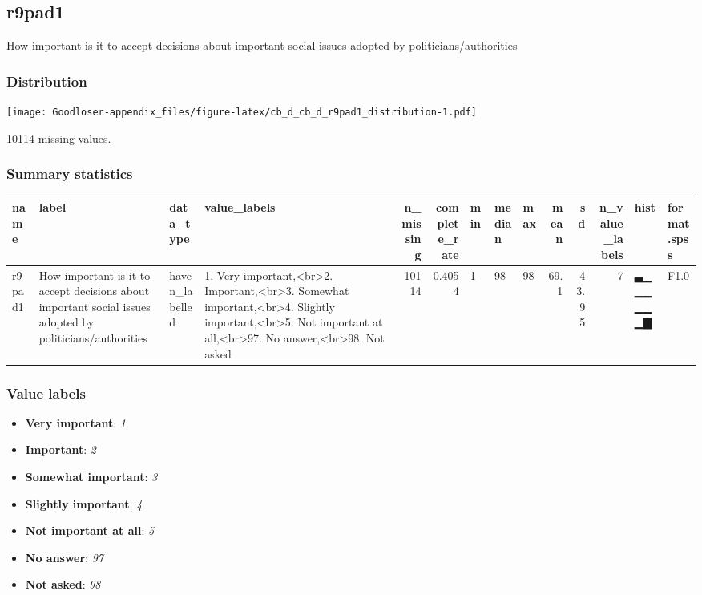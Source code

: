 \documentclass[
]{book}
\providecommand{\tightlist}{%
  \setlength{\itemsep}{0pt}\setlength{\parskip}{0pt}}
\begin{document}
\hypertarget{r9pad1}{%
\subsection{r9pad1}\label{r9pad1}}

How important is it to accept decisions about important social issues adopted by politicians/authorities

\hypertarget{r9pad1_distribution}{%
\subsubsection{Distribution}\label{r9pad1_distribution}}

\texttt{[image: Goodloser-appendix\_files/figure-latex/cb\_d\_cb\_d\_r9pad1\_distribution-1.pdf]}

10114 missing values.

\hypertarget{r9pad1_summary}{%
\subsubsection{Summary statistics}\label{r9pad1_summary}}

\begin{tabular}{l|l|l|l|r|r|l|l|l|r|r|r|l|l}
\hline
name & label & data_type & value_labels & n_missing & complete_rate & min & median & max & mean & sd & n_value_labels & hist & format.spss\\
\hline
r9pad1 & How important is it to accept decisions about important social issues adopted by politicians/authorities & haven_labelled & 1. Very important,<br>2. Important,<br>3. Somewhat important,<br>4. Slightly important,<br>5. Not important at all,<br>97. No answer,<br>98. Not asked & 10114 & 0.4054 & 1 & 98 & 98 & 69.1 & 43.95 & 7 & ▃▁▁▁▁▁▁▇ & F1.0\\
\hline
\end{tabular}

\hypertarget{r9pad1_labels}{%
\subsubsection{Value labels}\label{r9pad1_labels}}

\begin{itemize}
\tightlist
\item
  \textbf{Very important}: \emph{1}
\item
  \textbf{Important}: \emph{2}
\item
  \textbf{Somewhat important}: \emph{3}
\item
  \textbf{Slightly important}: \emph{4}
\item
  \textbf{Not important at all}: \emph{5}
\item
  \textbf{No answer}: \emph{97}
\item
  \textbf{Not asked}: \emph{98}
\end{itemize}
\end{document}
